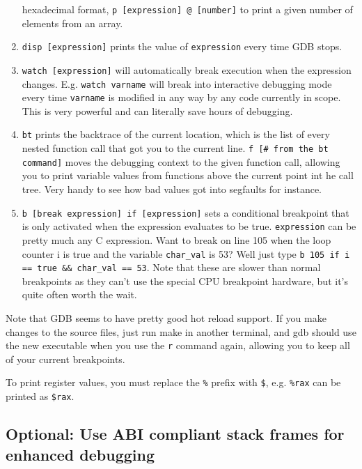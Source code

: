 \documentclass[11pt]{article}
\begin{document}
\begin{enumerate}
        hexadecimal format, \texttt{p [expression] @ [number]} to print a given number of
        elements from an array.
    \item \texttt{disp [expression]} prints the value of \texttt{expression} every time
        GDB stops.
    \item \texttt{watch [expression]} will automatically break execution when the
        expression changes. E.g. \texttt{watch varname} will break into interactive
        debugging mode every time \texttt{varname} is modified in any way by any code
        currently in scope. This is very powerful and can literally save hours of
        debugging.
    \item \texttt{bt} prints the backtrace of the current location, which is the list of
        every nested function call that got you to the current line. \texttt{f [\# from the
        bt command]} moves the debugging context to the given function call, allowing you
        to print variable values from functions above the current point int he call tree.
        Very handy to see how bad values got into segfaults for instance.
    \item \texttt{b [break expression] if [expression]} sets a conditional breakpoint that
        is only activated when the expression evaluates to be true. \texttt{expression}
        can be pretty much any C expression. Want to break on line 105 when the loop
        counter i is true and the variable \texttt{char\_val} is 53? Well just type
        \texttt{b 105 if i == true \&\& char\_val == 53}. Note that these are slower than
        normal breakpoints as they can't use the special CPU breakpoint hardware, but it's
        quite often worth the wait.
\end{enumerate}

Note that GDB seems to have pretty good hot reload support. If you make changes to the
source files, just run make in another terminal, and gdb should use the new executable
when you use the \texttt{r} command again, allowing you to keep all of your current
breakpoints.

To print register values, you must replace the \texttt{\%} prefix with \texttt{\$}, e.g.
\texttt{\%rax} can be printed as \texttt{\$rax}.

\subsection{Optional: Use ABI compliant stack frames for enhanced debugging}
\end{document}
